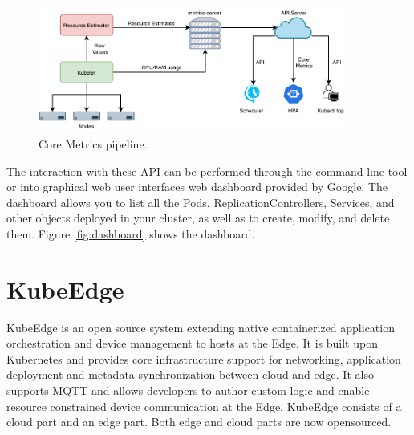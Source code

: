 \begin{figure}[htbp]
	\centering
	\includegraphics[width=0.9\textwidth]{images/k8smonitor.pdf}
	\caption{Core Metrics pipeline.}
	\label{fig:metricspipe}
\end{figure}

The interaction with these API can be performed through the command line tool or into graphical web user interfaces web dashboard provided by Google.
The dashboard allows you to list all the Pods, ReplicationControllers, Services, and other objects deployed in your cluster, as well as to create, modify, and delete them. Figure \ref{fig:dashboard} shows the dashboard.





\section{KubeEdge} \label{sec:kubeedgebackground}
KubeEdge is an open source system extending native containerized application orchestration and device management to hosts at the Edge. It is built upon Kubernetes and provides core infrastructure support for networking, application deployment and metadata synchronization between cloud and edge. It also supports MQTT and allows developers to author custom logic and enable resource constrained device communication at the Edge. KubeEdge consists of a cloud part and an edge part. Both edge and cloud parts are now opensourced.

